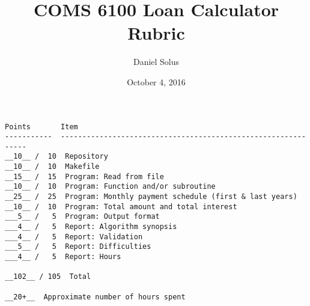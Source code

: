 \documentclass[11pt]{article}
\title{COMS 6100 Loan Calculator Rubric}
\author{Daniel Solus}
\date{October 4, 2016}
\begin{document}
\maketitle

\begin{verbatim}
Points       Item
-----------  --------------------------------------------------------------
__10__ /  10  Repository
__10__ /  10  Makefile
__15__ /  15  Program: Read from file
__10__ /  10  Program: Function and/or subroutine
__25__ /  25  Program: Monthly payment schedule (first & last years)
__10__ /  10  Program: Total amount and total interest
___5__ /   5  Program: Output format
___4__ /   5  Report: Algorithm synopsis
___4__ /   5  Report: Validation
___5__ /   5  Report: Difficulties
___4__ /   5  Report: Hours

__102__ / 105  Total

__20+__  Approximate number of hours spent
\end{verbatim}
\end{document}
